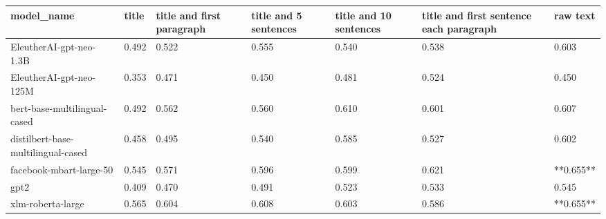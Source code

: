 \begin{tabular}{lllllll}
\toprule
                        model\_name & title & title and first paragraph & title and 5 sentences & title and 10 sentences & title and first sentence each paragraph &  raw text \\
\midrule
           EleutherAI-gpt-neo-1.3B & 0.492 &                     0.522 &                 0.555 &                  0.540 &                                   0.538 &     0.603 \\
           EleutherAI-gpt-neo-125M & 0.353 &                     0.471 &                 0.450 &                  0.481 &                                   0.524 &     0.450 \\
      bert-base-multilingual-cased & 0.492 &                     0.562 &                 0.560 &                  0.610 &                                   0.601 &     0.607 \\
distilbert-base-multilingual-cased & 0.458 &                     0.495 &                 0.540 &                  0.585 &                                   0.527 &     0.602 \\
           facebook-mbart-large-50 & 0.545 &                     0.571 &                 0.596 &                  0.599 &                                   0.621 & **0.655** \\
                              gpt2 & 0.409 &                     0.470 &                 0.491 &                  0.523 &                                   0.533 &     0.545 \\
                 xlm-roberta-large & 0.565 &                     0.604 &                 0.608 &                  0.603 &                                   0.586 & **0.655** \\
\bottomrule
\end{tabular}
